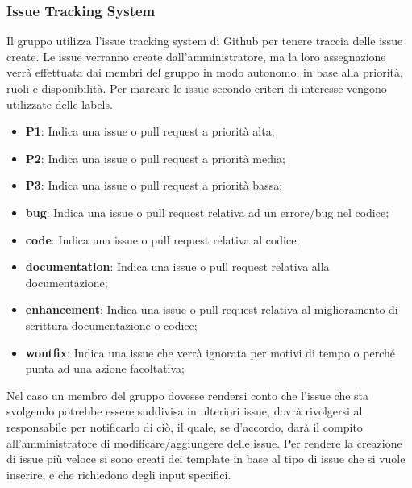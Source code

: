         \subsubsection{Issue Tracking System}\label{inf:its}
        Il gruppo utilizza l'issue tracking system di Github per tenere traccia delle issue create. Le issue verranno
        create dall'amministratore, ma la loro assegnazione verrà effettuata dai membri del gruppo in modo autonomo, in base
        alla priorità, ruoli e disponibilità.
        Per marcare le issue secondo criteri di interesse vengono utilizzate delle labels.
        \begin{itemize}
            \item \textbf{P1}: Indica una issue o pull request a priorità alta;
            \item \textbf{P2}: Indica una issue o pull request a priorità media;
            \item \textbf{P3}: Indica una issue o pull request a priorità bassa;
            \item \textbf{bug}: Indica una issue o pull request relativa ad un errore/bug nel codice;
            \item \textbf{code}: Indica una issue o pull request relativa al codice;
            \item \textbf{documentation}: Indica una issue o pull request relativa alla documentazione;
            \item \textbf{enhancement}: Indica una issue o pull request relativa al miglioramento di scrittura documentazione o codice;
            \item \textbf{wontfix}: Indica una issue che verrà ignorata per motivi di tempo o perché punta ad una azione facoltativa;
        \end{itemize}
        Nel caso un membro del gruppo dovesse rendersi conto che l'issue che sta svolgendo potrebbe essere
        suddivisa in ulteriori issue, dovrà rivolgersi al responsabile per notificarlo di ciò, il quale, se d'accordo,
        darà il compito all'amministratore di modificare/aggiungere delle issue.
        Per rendere la creazione di issue più veloce si sono creati dei template in base al tipo di issue che si vuole inserire, e che richiedono degli input
        specifici.
